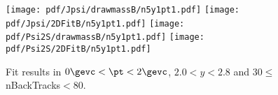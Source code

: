 \begin{figure}[H]
\begin{center}
\texttt{[image: pdf/Jpsi/drawmassB/n5y1pt1.pdf]}
\texttt{[image: pdf/Jpsi/2DFitB/n5y1pt1.pdf]}
\vspace*{-0.5cm}
\texttt{[image: pdf/Psi2S/drawmassB/n5y1pt1.pdf]}
\texttt{[image: pdf/Psi2S/2DFitB/n5y1pt1.pdf]}
\vspace*{-0.5cm}
\end{center}
\caption{Fit results in $0\gevc<\pt<2\gevc$, $2.0<y<2.8$ and 30$\leq$nBackTracks$<$80.}
\label{Fitn5y1pt1}
\end{figure}
